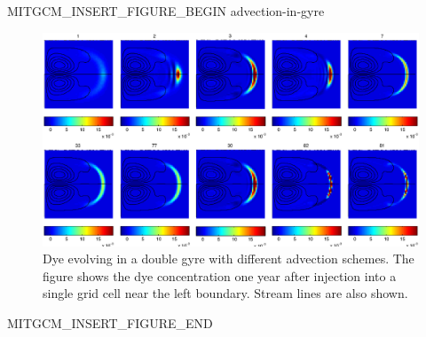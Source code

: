 \begin{rawhtml}MITGCM_INSERT_FIGURE_BEGIN advection-in-gyre\end{rawhtml}
\begin{figure}
\begin{center}
 \includegraphics*[width=\textwidth]{s_examples/advection_in_gyre/all012.eps}
\end{center}
\caption{Dye evolving in a double gyre with different advection schemes.  The figure shows the
dye concentration one year after injection into a single grid cell near the left boundary.
Stream lines are also shown.}
\label{fig:adv-gyre-all}
\end{figure}
\begin{rawhtml}MITGCM_INSERT_FIGURE_END\end{rawhtml}
